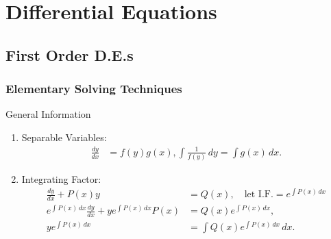 \documentclass[oneside]{book}
\begin{document}
\chapter{Differential Equations}
\section{First Order D.E.s}
\subsection{Elementary Solving Techniques}
\begin{stbox}{General Information}
  \begin{enumerate}
    \item Separable Variables:
    \begin{align*}
      \frac{dy}{dx}&=f(y)g(x),
      \int \frac{1}{f(y)}\,dy=\int g(x)\,dx.
    \end{align*}
    \item Integrating Factor:
    \begin{align*}
      \frac{dy}{dx}+P(x)y&=Q(x),\quad\text{let I.F.}=e^{\int P(x)\,dx}\\
      e^{\int P(x)\,dx} \frac{dy}{dx}+ye^{\int P(x)\,dx}P(x)&=Q(x)e^{\int P(x)\,dx},\\
      ye^{\int P(x)\,dx}&=\int Q(x)e^{\int P(x)\,dx}\,dx.
    \end{align*}
  \end{enumerate}
\end{stbox}
\end{document}
